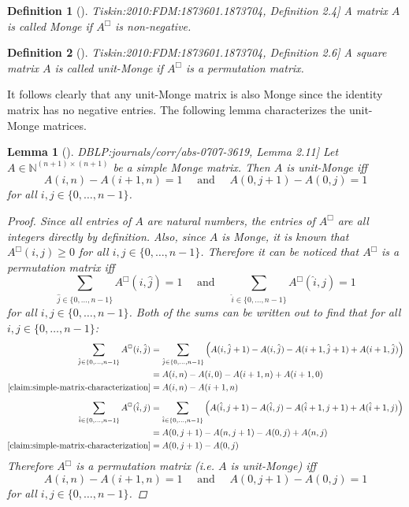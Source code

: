 \documentclass[twoside,11pt,openright]{report}
\newcommand{\refbook}[2]{\cite[#1]{DBLP:journals/corr/abs-0707-3619}, #2}
\newcommand{\reftiskin}[2]{\cite[#1]{Tiskin:2010:FDM:1873601.1873704}, #2}
\newtheorem{mydef}{Definition}
\newtheorem{lemma}{Lemma}
\begin{document}
%
\begin{mydef}[\reftiskin{p. 1288}{Definition 2.4}]
  A matrix $A$ is called Monge if $A^{\Box}$ is non-negative.
\end{mydef}
\begin{mydef}[\reftiskin{p. 1288}{Definition 2.6}]
  A square matrix $A$ is called unit-Monge if $A^{\Box}$ is a permutation matrix.
\end{mydef}
It follows clearly that any unit-Monge matrix is also Monge since the identity matrix has no negative entries. The following lemma characterizes the unit-Monge matrices.
\begin{lemma}[\refbook{p. 10}{Lemma 2.11}]
  \label{lemma:unit-monge-characterization}
  Let $A \in \mathbb{N}^{(n + 1) \times (n + 1)}$ be a simple Monge matrix. Then $A$ is unit-Monge iff
  \[
    A(i, n) - A(i + 1, n) = 1 \quad \text{ and } \quad A(0, j + 1) - A(0, j) = 1
  \]
  for all $i, j \in \{0, \dots, n - 1\}$.
  \begin{proof}
    Since all entries of $A$ are natural numbers, the entries of $A^{\Box}$ are all integers directly by definition. Also, since $A$ is Monge, it is known that $A^{\Box}(i, j) \geq 0$ for all $i, j \in \{0, \dots, n - 1\}$. Therefore it can be noticed that $A^{\Box}$ is a permutation matrix iff
    \[
      \sum_{\hat{j} \in \{0, \dots, n - 1\}} A^{\Box}(i, \hat{j}) = 1
      \quad \text{ and } \quad
      \sum_{\hat{i} \in \{0, \dots, n - 1\}} A^{\Box}(\hat{i}, j) = 1
    \]
    for all $i, j \in \{0, \dots, n - 1\}$. Both of the sums can be written out to find that for all $i, j \in \{0, \dots, n - 1\}$:
    \begin{align*}
      \sum_{\hat{j} \in \{0, \dots, n - 1\}} A^{\Box}(i, \hat{j})
        &= \sum_{\hat{j} \in \{0, \dots, n - 1\}} \left( A(i, \hat{j} + 1) - A(i, \hat{j}) - A(i + 1, \hat{j} + 1) + A(i + 1, \hat {j}) \right) \\
        &= A(i, n) - A(i, 0) - A(i + 1, n) + A(i + 1, 0) \\
        \text{\cref{claim:simple-matrix-characterization}} &= A(i, n) - A(i + 1, n)
    \end{align*}
    \begin{align*}
      \sum_{\hat{i} \in \{0, \dots, n - 1\}} A^{\Box}(\hat{i}, j)
        &= \sum_{\hat{i} \in \{0, \dots, n - 1\}} \left( A(\hat{i}, j + 1) - A(\hat{i}, j) - A(\hat{i} + 1, j + 1) + A(\hat{i} + 1, j) \right) \\
        &= A(0, j + 1) - A(n, j + 1) - A(0, j) + A(n, j) \\
        \text{\cref{claim:simple-matrix-characterization}} &= A(0, j + 1) - A(0, j)
    \end{align*}
    Therefore $A^{\Box}$ is a permutation matrix (i.e. $A$ is unit-Monge) iff
    \[
      A(i, n) - A(i + 1, n) = 1 \quad \text{ and } \quad A(0, j + 1) - A(0, j) = 1
    \]
    for all $i, j \in \{0, \dots, n - 1\}$.
  \end{proof}
\end{lemma}
\end{document}
